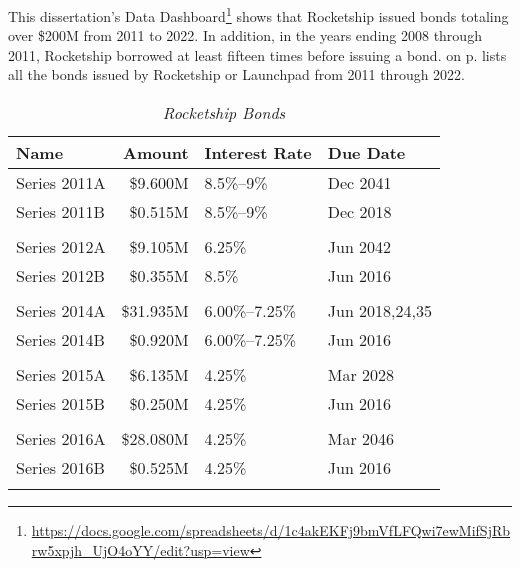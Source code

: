 
This dissertation's Data Dashboard\footnote{\url{https://docs.google.com/spreadsheets/d/1c4akEKFj9bmVfLFQwi7ewMifSjRbrw5xpjh_UjO4oYY/edit?usp=view}} shows that Rocketship issued bonds totaling over \$200M from 2011 to 2022. In addition, in the years ending 2008 through 2011, Rocketship borrowed at least fifteen times before issuing a bond.  on p. \pageref{tab:rocketship_bonds} lists all the bonds issued by Rocketship or Launchpad from 2011 through 2022.

\begin{table}[htp]
  \SingleSpacing
  \caption[Rocketship Bonds]{\textit{Rocketship Bonds}}%
  \label{tab:rocketship_bonds}
  \begin{tabularx}{\textwidth}{lrll}
    \toprule
    Name             & Amount    & Interest Rate  & Due Date       \\
    \midrule
    Series 2011A     & \$9.600M  & 8.5\%–9\%      & Dec 2041       \\
    Series 2011B     & \$0.515M  & 8.5\%–9\%      & Dec 2018       \\
                                                                   \\
    Series 2012A     & \$9.105M  & 6.25\%         & Jun 2042       \\
    Series 2012B     & \$0.355M  & 8.5\%          & Jun 2016       \\
                                                                   \\
    Series 2014A     & \$31.935M & 6.00\%–7.25\%  & Jun 2018,24,35 \\
    Series 2014B     & \$0.920M  & 6.00\%–7.25\%  & Jun 2016       \\
                                                                   \\
    Series 2015A     & \$6.135M  & 4.25\%         & Mar 2028       \\
    Series 2015B     & \$0.250M  & 4.25\%         & Jun 2016       \\
                                                                   \\
    Series 2016A     & \$28.080M & 4.25\%         & Mar 2046       \\
    Series 2016B     & \$0.525M  & 4.25\%         & Jun 2016       \\
                                                                   \\

\end{tabularx}
\end{table}
